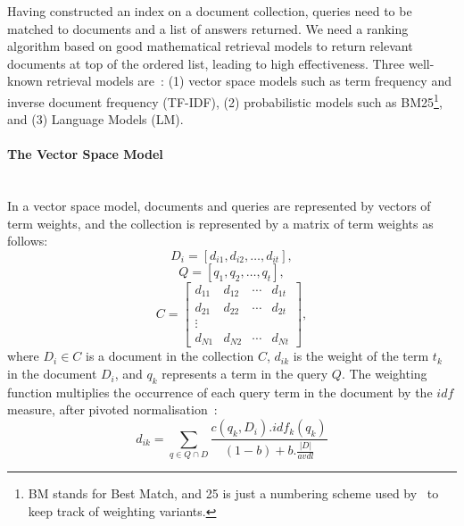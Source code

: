 Having constructed an index on a document collection, queries need to 
be matched to documents and a list of answers returned. We need a ranking algorithm based on good mathematical retrieval models to 
return relevant documents at top of the ordered list, leading to high effectiveness. 
Three well-known retrieval models are~\citep{croft2010search}: (1) vector space models such as term frequency and inverse document frequency (TF-IDF), (2) probabilistic models such as BM25\footnote{BM stands for Best Match, and 25 is just a numbering scheme used by~\cite{robertson1994some} to keep track of weighting variants.}, and (3) Language Models (LM). 

\paragraph{The Vector Space Model}
\ \\
In a vector space model, documents and queries are represented by vectors of term weights, and the collection is represented by a matrix of term weights as follows: 
\begin{displaymath} 
D_{i}=[d_{i1}, d_{i2}, \ldots , d_{it}],
\end{displaymath}
\begin{displaymath} 
Q=[q_{1}, q_{2}, \ldots , q_{t}],
\end{displaymath}
\begin{displaymath} 
C=\begin{bmatrix}
        d_{11} & d_{12} & \cdots & d_{1t}\\
        d_{21} & d_{22} & \cdots & d_{2t}\\
        \vdots\\
        d_{N1} & d_{N2} & \cdots & d_{Nt}
     \end{bmatrix},
\end{displaymath}
\noindent
where $ D_{i}\in C $ is a document in the collection $ C $, $ d_{ik} $ is the weight of the term $ t_{k} $ in the document $ D_{i} $, and $ q_{k} $ represents a term in the query $ Q $.
The weighting function multiplies the occurrence of each query term in the document
by the $ idf $ measure, after pivoted normalisation~\citep{bache2010improving}:
\begin{equation}
d_{ik}=\sum\limits_{q \in Q\cap D}\frac{c(q_{k},D_{i}).idf_{k}(q_{k})}{(1-b)+b.\frac{|D|}{avdl}}
\label{eq:tfidf}
\end{equation}
